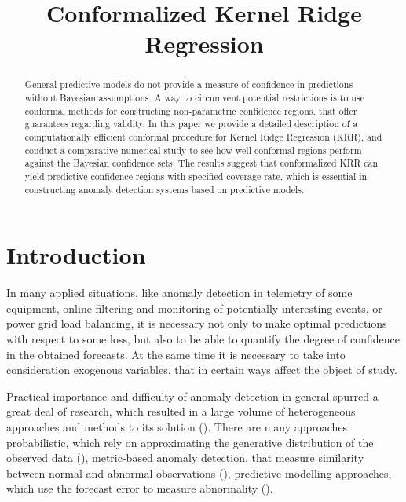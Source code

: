 \documentclass[conference]{IEEEtran}
\title{Conformalized Kernel Ridge Regression}
\author{
\IEEEauthorblockN{
Burnaev\IEEEauthorrefmark{1}, E. V.,
Nazarov\IEEEauthorrefmark{2}, I. N.}
\IEEEauthorblockA{
\IEEEauthorrefmark{1}IITP RAS, Skoltech, e.burnaev@skoltech.ru}
\IEEEauthorblockA{\IEEEauthorrefmark{2} IITP RAS, ivan.nazarov@iitp.ru}
}
\begin{document}
\maketitle

\begin{abstract}
General predictive models do not provide a measure of confidence in predictions
without Bayesian assumptions. A way to circumvent potential restrictions is to
use conformal methods for constructing non-parametric confidence regions, that
offer guarantees regarding validity. In this paper we provide a detailed description
of a computationally efficient conformal procedure for Kernel Ridge Regression (KRR),
and conduct a comparative numerical study to see how well conformal regions perform
against the Bayesian confidence sets. The results suggest that conformalized KRR
can yield predictive confidence regions with specified coverage rate, which is
essential in constructing anomaly detection systems based on predictive models.
\end{abstract}

\section{Introduction} %
\label{sec:introduction}

In many applied situations, like anomaly detection in telemetry of some equipment,
online filtering and monitoring of potentially interesting events, or power grid
load balancing, it is necessary not only to make optimal predictions with respect
to some loss, but also to be able to quantify the degree of confidence in the obtained
forecasts. At the same time it is necessary to take into consideration exogenous
variables, that in certain ways affect the object of study. 

Practical importance and difficulty of anomaly detection in general spurred a great
deal of research, which resulted in a large volume of heterogeneous approaches and
methods to its solution (\cite{Alestra2014, Burnaev2015, Artemov2015}). There are many
approaches: probabilistic, which rely on approximating the generative distribution
of the observed data (\cite{aggarwal2008, scott2008}), metric-based anomaly detection,
that measure similarity between normal and abnormal observations (\cite{hautamaki2004,
breunig2000, kriegel2009}), predictive modelling approaches, which use the forecast
error to measure abnormality (\cite{augusteijn2002, hawkins2002, hoffmann2007, scholkopf1998}).
\end{document}

